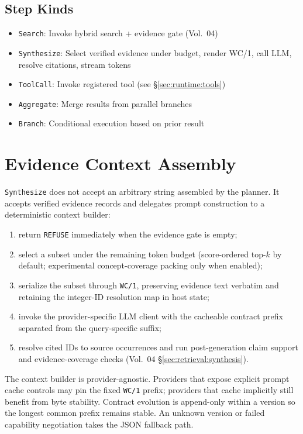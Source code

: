 \subsection{Step Kinds}
\label{sec:runtime:step-kinds}

\begin{itemize}
  \item \texttt{Search}: Invoke hybrid search + evidence gate (Vol.~04)
  \item \texttt{Synthesize}: Select verified evidence under budget, render WC/1, call LLM, resolve citations, stream tokens
  \item \texttt{ToolCall}: Invoke registered tool (see \S\ref{sec:runtime:tools})
  \item \texttt{Aggregate}: Merge results from parallel branches
  \item \texttt{Branch}: Conditional execution based on prior result
\end{itemize}

\section{Evidence Context Assembly}
\label{sec:runtime:context-assembly}

\texttt{Synthesize} does not accept an arbitrary string assembled by the
planner. It accepts verified evidence records and delegates prompt construction
to a deterministic context builder:
\begin{enumerate}
  \item return \texttt{REFUSE} immediately when the evidence gate is empty;
  \item select a subset under the remaining token budget (score-ordered top-$k$
        by default; experimental concept-coverage packing only when enabled);
  \item serialize the subset through \texttt{WC/1}, preserving evidence text
        verbatim and retaining the integer-ID resolution map in host state;
  \item invoke the provider-specific LLM client with the cacheable contract
        prefix separated from the query-specific suffix;
  \item resolve cited IDs to source occurrences and run post-generation claim
        support and evidence-coverage checks (Vol.~04
        \S\ref{sec:retrieval:synthesis}).
\end{enumerate}

The context builder is provider-agnostic. Providers that expose explicit prompt
cache controls may pin the fixed \texttt{WC/1} prefix; providers that cache
implicitly still benefit from byte stability. Contract evolution is append-only
within a version so the longest common prefix remains stable. An unknown
version or failed capability negotiation takes the JSON fallback path.

